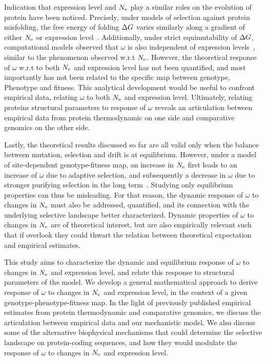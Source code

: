 Indication that expression level and $N_{\mathrm{e}}$ play a similar roles on the evolution of protein have been noticed.
Precisely, under models of selection against protein misfolding, the free energy of folding $\Delta G$ varies similarly along a gradient of either $N_{\mathrm{e}}$ or expression level~\citep{Serohijos2013}.
Additionally, under strict equimutability of $\Delta G$, computational models observed that $\omega$ is also independent of expression levels~\citep{Serohijos2012}, similar to the phenomenon observed w.r.t $N_{\mathrm{e}}$.
However, the theoretical response of $\omega$ w.r.t to both $N_{\mathrm{e}}$ and expression level has not been quantified, and most importantly has not been related to the specific map between genotype, \gls{Phenotype} and fitness.
This analytical development would be useful to confront empirical data, relating $\omega$ to both $N_{\mathrm{e}}$ and expression level.
Ultimately, relating proteins structural parameters to response of $\omega$ reveals an articulation between empirical data from protein thermodynamic on one side and comparative genomics on the other side. 

Lastly, the theoretical results discussed so far are all valid only when the balance between mutation, selection and drift is at equilibrium.
However, under a model of site-dependent genotype-fitness map, an increase in $N_{\mathrm{e}}$ first leads to an increase of $\omega$ due to adaptive selection, and subsequently a decrease in $\omega$ due to stronger purifying selection in the long term~\citep{Jones2016}.
Studying only equilibrium properties can thus be misleading.
For that reason, the dynamic response of $\omega$ to changes in $N_{\mathrm{e}}$ must also be addressed, quantified, and its connection with the underlying selective landscape better characterized.
Dynamic properties of $\omega$ to changes in $N_{\mathrm{e}}$ are of theoretical interest, but are also empirically relevant such that if overlook they could thwart the relation between theoretical expectation and empirical estimates.

This study aims to characterize the dynamic and equilibrium response of $\omega$ to changes in $N_{\mathrm{e}}$ and expression level, and relate this response to structural parameters of the model.
We develop a general mathematical approach to derive response of $\omega$ to changes in $N_{\mathrm{e}}$ and expression level, in the context of a given genotype-phenotype-fitness map.
In the light of previously published empirical estimates from protein thermodynamic and comparative genomics, we discuss the articulation between empirical data and our mechanistic model.
We also discuss some of the alternative biophysical mechanisms that could determine the selective landscape on protein-coding sequences, and how they would modulate the response of $\omega$ to changes in $N_{\mathrm{e}}$ and expression level.

